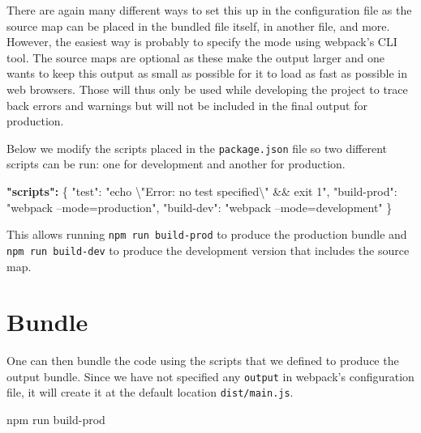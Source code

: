 \documentclass[10pt,]{krantz}
\makeatletter
\newenvironment{Shaded}{\begin{snugshade}}{\end{snugshade}}
\newcommand{\CharTok}[1]{\textcolor[rgb]{0.5,0.5,0.5}{#1}}
\newcommand{\DataTypeTok}[1]{\textcolor[rgb]{0.27,0.27,0.27}{#1}}
\newcommand{\ErrorTok}[1]{\textcolor[rgb]{0.14,0.14,0.14}{\textbf{#1}}}
\newcommand{\ExtensionTok}[1]{#1}
\newcommand{\FunctionTok}[1]{\textcolor[rgb]{0,0,0}{#1}}
\newcommand{\NormalTok}[1]{#1}
\newcommand{\StringTok}[1]{\textcolor[rgb]{0.5,0.5,0.5}{#1}}
\newenvironment{kframe}{%
\medskip{}
\setlength{\fboxsep}{.8em}
 \def\at@end@of@kframe{}%
 \ifinner\ifhmode%
  \def\at@end@of@kframe{\end{minipage}}%
  \begin{minipage}{\columnwidth}%
 \fi\fi%
 \def\FrameCommand##1{\hskip\@totalleftmargin \hskip-\fboxsep
 \colorbox{shadecolor}{##1}\hskip-\fboxsep
     \hskip-\linewidth \hskip-\@totalleftmargin \hskip\columnwidth}%
 \MakeFramed {\advance\hsize-\width
   \@totalleftmargin\z@ \linewidth\hsize
   \@setminipage}}%
 {\par\unskip\endMakeFramed%
 \at@end@of@kframe}
\renewenvironment{Shaded}{\begin{kframe}}{\end{kframe}}
\makeatother
\begin{document}
There are again many different ways to set this up in the configuration file as the source map can be placed in the bundled file itself, in another file, and more. However, the easiest way is probably to specify the mode using webpack's CLI tool. The source maps are optional as these make the output larger and one wants to keep this output as small as possible for it to load as fast as possible in web browsers. Those will thus only be used while developing the project to trace back errors and warnings but will not be included in the final output for production.

Below we modify the scripts placed in the \texttt{package.json} file so two different scripts can be run: one for development and another for production.

\begin{Shaded}
\begin{Highlighting}[]
\ErrorTok{"scripts":} \FunctionTok{\{}
  \DataTypeTok{"test"}\FunctionTok{:} \StringTok{"echo }\CharTok{\textbackslash{}"}\StringTok{Error: no test specified}\CharTok{\textbackslash{}"}\StringTok{ && exit 1"}\FunctionTok{,}
  \DataTypeTok{"build-prod"}\FunctionTok{:} \StringTok{"webpack --mode=production"}\FunctionTok{,}
  \DataTypeTok{"build-dev"}\FunctionTok{:} \StringTok{"webpack --mode=development"}
\FunctionTok{\}}
\end{Highlighting}
\end{Shaded}

This allows running \texttt{npm\ run\ build-prod} to produce the production bundle and \texttt{npm\ run\ build-dev} to produce the development version that includes the source map.

\hypertarget{webpack-intro-bundle}{%
\section{Bundle}\label{webpack-intro-bundle}}

One can then bundle the code using the scripts that we defined to produce the output bundle. Since we have not specified any \texttt{output} in webpack's configuration file, it will create it at the default location \texttt{dist/main.js}.

\begin{Shaded}
\begin{Highlighting}[]
\ExtensionTok{npm}\NormalTok{ run build-prod}
\end{Highlighting}
\end{Shaded}
\end{document}

